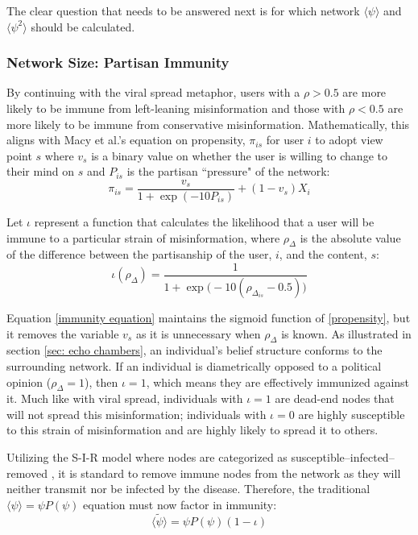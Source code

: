 \documentclass[preprint,review,12pt]{elsarticle}
\begin{document}
The clear question that needs to be answered next is for which network $\langle \psi \rangle$ and $\langle \psi^2 \rangle$ should be calculated. 

\subsubsection{Network Size: Partisan Immunity}
By continuing with the viral spread metaphor, users with a $\rho > 0.5$ are more likely to be immune from left-leaning misinformation and those with  $\rho < 0.5$ are more likely to be immune from conservative misinformation. Mathematically, this aligns with Macy et al.'s equation on propensity, $\pi_{is}$ for user $i$ to adopt view point $s$ where $v_s$ is a binary value on whether the user is willing to change to their mind on $s$ and $P_{is}$ is the partisan ``pressure" of the network:
\begin{equation}
\label{propensity}
    \pi_{is}=\frac{v_s}{1+\exp{(-10P_{is})}}+(1-v_{s})X_i
\end{equation}

Let $\iota$ represent a function that calculates the likelihood that a user will be immune to a particular strain of misinformation, where $\rho_{\Delta}$ is the absolute value of the difference between the partisanship of the user, $i$, and the content, $s$:
\begin{equation}
\label{immunity equation}
    \iota(\rho_{\Delta})=\frac{1}{1+\exp{\big(-10 (\rho_{\Delta_{is}}-0.5)\big)}}
\end{equation}

Equation \ref{immunity equation} maintains the sigmoid function of \ref{propensity}, but it removes the variable $v_s$ as it is unnecessary when $\rho_{\Delta}$ is known. As illustrated in section \ref{sec: echo chambers}, an individual's belief structure conforms to the surrounding network. If an individual is diametrically opposed to a political opinion ($\rho_{\Delta} = 1$), then $\iota = 1$, which means they are effectively immunized against it. Much like with viral spread, individuals with $\iota = 1$ are dead-end nodes that will not spread this misinformation; individuals with $\iota = 0$ are highly susceptible to this strain of misinformation and are highly likely to spread it to others.

Utilizing the S-I-R model where nodes are categorized as susceptible–infected–removed \cite{ferrari2006network,bailey1975mathematical,newman2005threshold,newman2002spread}, it is standard to remove immune nodes from the network as they will neither transmit nor be infected by the disease. Therefore, the traditional $\langle \psi \rangle = \psi P(\psi)$ equation must now factor in immunity:
\begin{equation}
\label{psi immunized}
 \langle \tilde{\psi} \rangle =  \psi P(\psi)(1-\iota)
\end{equation}
\end{document}
